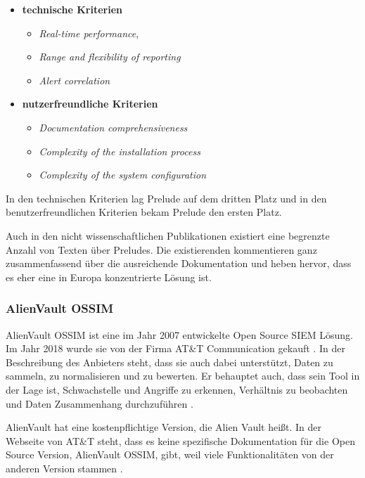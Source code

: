 \begin{itemize}[noitemsep]
   \item \textbf{technische Kriterien}
   \begin{itemize}[noitemsep]
      \item \textit{Real-time performance}, 
      \item \textit{Range and flexibility of reporting}
      \item \textit{Alert correlation}
   \end{itemize}

   \item \textbf{nutzerfreundliche Kriterien}
   \begin{itemize}[noitemsep]
      \item \textit{Documentation comprehensiveness}
      \item \textit{Complexity of the installation process}
      \item \textit{Complexity of the system configuration}
   \end{itemize}
\end{itemize}

In den technischen Kriterien lag Prelude auf dem dritten Platz und in den benutzerfreundlichen Kriterien bekam Prelude den ersten Platz. 

Auch in den nicht wissenschaftlichen Publikationen existiert eine begrenzte Anzahl von Texten über Preludes. Die existierenden kommentieren ganz zusammenfassend über die ausreichende Dokumentation und heben hervor, dass es eher eine in Europa konzentrierte Lösung ist.

\subsubsection{AlienVault OSSIM}
AlienVault OSSIM ist eine im Jahr 2007 entwickelte \gls{Open Source} SIEM Lösung. Im Jahr 2018 wurde sie von der Firma AT\&T Communication gekauft \citep{CBN_AV}. In der Beschreibung des Anbieters steht, dass sie auch dabei unterstützt, Daten zu sammeln, zu normalisieren und zu bewerten. Er behauptet auch, dass sein Tool in der Lage ist, Schwachstelle und Angriffe zu erkennen, Verhältnis zu beobachten und Daten Zusammenhang durchzuführen \citep{ATT_AVO}.

AlienVault hat eine kostenpflichtige Version, die Alien Vault  heißt. In der Webseite von AT\&T steht, dass es keine spezifische Dokumentation für die \gls{Open Source} Version, AlienVault OSSIM, gibt, weil viele Funktionalitäten von der anderen Version stammen \citep{ATT_AVO}. 

